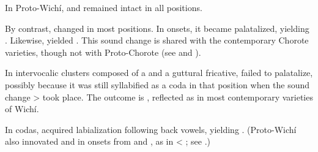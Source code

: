 In Proto-Wichí,  and  remained intact in all positions.

\sloppy
\begin{exe}
    \ex \food
    \ex \elbow
    \ex \alienable
    \ex \medicine
    \ex \distrust
    \ex \leg
    \ex \standv
    \ex \starn
    \ex \limpkin
    \ex \belt
    \ex \yellowv
    \ex \fishwithhook
    \ex \costume
    \ex \noden
    \ex \soul
    \ex \wildcat
    \ex \cardon
    \ex \chaja
    \ex \cord
    \ex \wildhoney
\end{exe}

By contrast,  changed in most positions. In onsets, it became palatalized, yielding . Likewise,  yielded . This sound change is shared with the contemporary Chorote varieties, though not with Proto-Chorote (see  and ).

\begin{exe}
    \ex \grove
    \ex \takeaway
    \ex \lizard
    \ex \testicle
    \ex \tail
    \ex \redv
    \ex \fall
    \ex \torn
    \ex \grandchild
    \ex \monkparakeet
    \ex \redquebracho
    \ex \sendv
    \ex \feminine
    \ex \elderbro
    \ex \eldersis
    \ex \heavyv
    \ex \locustcw
    \ex \hole
    \ex \tortoise
    \ex \whitealgarrobof
    \ex \answer
    \ex \grabwork
    \ex \meet
    \ex \chaguark
    \ex \sweat
    \ex \leniosapl
    \ex \cactus
    \ex \kidney
    \ex \armadillo
    \ex \arrowkaxe
    \ex \spouse
    \ex \stretchout
    \ex \dividev
    \ex \youngerbro
    \ex \youngersis
    \ex \bottomn
    \ex \hornclub
    \ex \thorncutjan
    \ex \oldn
    \ex \flu
    \ex \newadj
    \ex \medicine
    \ex \distrust
    \ex \mesh
    \ex \precipice
    \ex \face
    \ex \eyebrow
    \ex \guayacan
    \ex \metal
    \ex \egg
\end{exe}

In intervocalic clusters composed of a  and a guttural fricative,  failed to palatalize, possibly because it was still syllabified as a coda in that position when the sound change  >  took place. The outcome is , reflected as  in most contemporary varieties of Wichí.

\begin{exe}
    \ex \lapcalf
\end{exe}

In codas,  acquired labialization following back vowels, yielding . (Proto-Wichí also innovated  and  in onsets from  and , as in  < ; see .)

